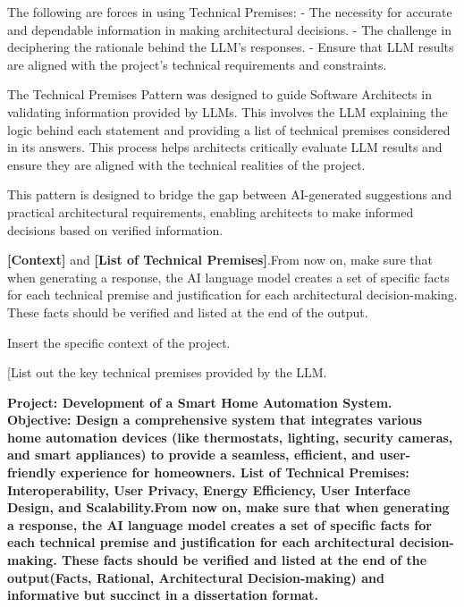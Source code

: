  The following are forces in using Technical Premises:
\newline
- The necessity for accurate and dependable information in making architectural decisions.
\newline
- The challenge in deciphering the rationale behind the LLM's responses.
\newline
- Ensure that LLM results are aligned with the project's technical requirements and constraints.
    
 The Technical Premises Pattern was designed to guide Software Architects in validating information provided by LLMs. This involves the LLM explaining the logic behind each statement and providing a list of technical premises considered in its answers. This process helps architects critically evaluate LLM results and ensure they are aligned with the technical realities of the project.

 This pattern is designed to bridge the gap between AI-generated suggestions and practical architectural requirements, enabling architects to make informed decisions based on verified information.

 \textbf{\textcolor{mycolorgreen}{[Context]}} and \textbf{\textcolor{mycolorblue}{[List of Technical Premises]}}.From now on, make sure that when generating a response, the AI language model creates a set of specific facts for each technical premise and justification for each architectural decision-making. These facts should be verified and listed at the end of the output.

\MyParaBold{\textcolor{mycolorgreen}{[Context]:}} Insert the specific context of the project.

\MyParaBold{\textcolor{mycolorblue}{[List of Technical Premises]:}} [List out the key technical premises provided by the LLM.

\textbf{\textcolor{mycolorgreen}{Project: Development of a Smart Home Automation System. Objective: Design a comprehensive system that integrates various home automation devices (like thermostats, lighting, security cameras, and smart appliances) to provide a seamless, efficient, and user-friendly experience for homeowners.} \textcolor{mycolorblue}{List of Technical Premises: Interoperability, User Privacy, Energy Efficiency, User Interface Design, and Scalability.}}\textbf{From now on, make sure that when generating a response, the AI language model creates a set of specific facts for each technical premise and justification for each architectural decision-making. These facts should be verified and listed at the end of the output(Facts, Rational, Architectural Decision-making) and informative but succinct in a dissertation format.}

